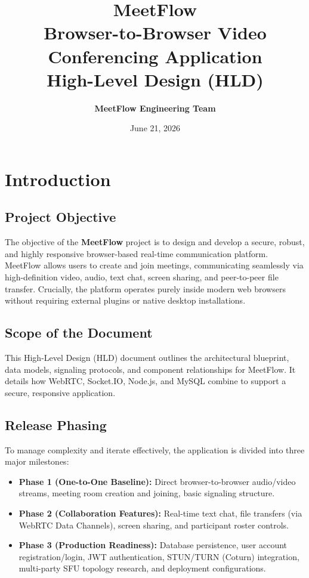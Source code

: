 \documentclass[11pt,a4paper]{article}
\title{
    \vspace{2in}
    \Huge \textbf{MeetFlow} \\
    \Large Browser-to-Browser Video Conferencing Application \\
    \vspace{0.5in}
    \huge \textbf{High-Level Design (HLD)}
    \vspace{1.5in}
}
\author{
    \textbf{MeetFlow Engineering Team}
}
\date{June 21, 2026}
\begin{document}
\maketitle
\thispagestyle{empty}
\newpage

\tableofcontents
\newpage

\section{Introduction}

\subsection{Project Objective}
The objective of the \textbf{MeetFlow} project is to design and develop a secure, robust, and highly responsive browser-based real-time communication platform. MeetFlow allows users to create and join meetings, communicating seamlessly via high-definition video, audio, text chat, screen sharing, and peer-to-peer file transfer. Crucially, the platform operates purely inside modern web browsers without requiring external plugins or native desktop installations.

\subsection{Scope of the Document}
This High-Level Design (HLD) document outlines the architectural blueprint, data models, signaling protocols, and component relationships for MeetFlow. It details how WebRTC, Socket.IO, Node.js, and MySQL combine to support a secure, responsive application.

\subsection{Release Phasing}
To manage complexity and iterate effectively, the application is divided into three major milestones:
\begin{itemize}
    \item \textbf{Phase 1 (One-to-One Baseline):} Direct browser-to-browser audio/video streams, meeting room creation and joining, basic signaling structure.
    \item \textbf{Phase 2 (Collaboration Features):} Real-time text chat, file transfers (via WebRTC Data Channels), screen sharing, and participant roster controls.
    \item \textbf{Phase 3 (Production Readiness):} Database persistence, user account registration/login, JWT authentication, STUN/TURN (Coturn) integration, multi-party SFU topology research, and deployment configurations.
\end{itemize}
\end{document}

